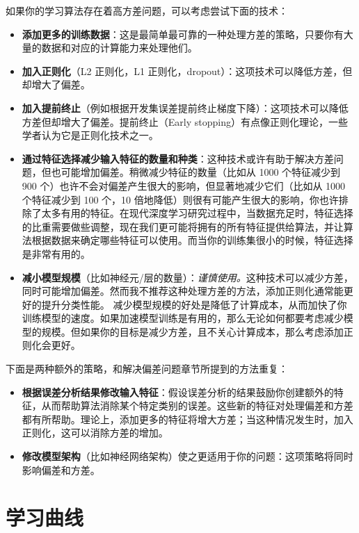 如果你的学习算法存在着高方差问题，可以考虑尝试下面的技术：

\begin{itemize}
\tightlist
\item
  \textbf{添加更多的训练数据}：这是最简单最可靠的一种处理方差的策略，只要你有大量的数据和对应的计算能力来处理他们。
\item
  \textbf{加入正则化}（L2 正则化，L1
  正则化，dropout）：这项技术可以降低方差，但却增大了偏差。
\item
  \textbf{加入提前终止}（例如根据开发集误差提前终止梯度下降）：这项技术可以降低方差但却增大了偏差。提前终止（Early
  stopping）有点像正则化理论，一些学者认为它是正则化技术之一。
\item
  \textbf{通过特征选择减少输入特征的数量和种类}：这种技术或许有助于解决方差问题，但也可能增加偏差。稍微减少特征的数量（比如从
  1000 个特征减少到 900
  个）也许不会对偏差产生很大的影响，但显著地减少它们（比如从 1000
  个特征减少到 100 个，10
  倍地降低）则很有可能产生很大的影响，你也许排除了太多有用的特征。在现代深度学习研究过程中，当数据充足时，特征选择的比重需要做些调整，现在我们更可能将拥有的所有特征提供给算法，并让算法根据数据来确定哪些特征可以使用。而当你的训练集很小的时候，特征选择是非常有用的。
\item
  \textbf{减小模型规模}（比如神经元/层的数量）：\emph{谨慎使用。}这种技术可以减少方差，同时可能增加偏差。然而我不推荐这种处理方差的方法，添加正则化通常能更好的提升分类性能。
  减少模型规模的好处是降低了计算成本，从而加快了你训练模型的速度。如果加速模型训练是有用的，那么无论如何都要考虑减少模型的规模。但如果你的目标是减少方差，且不关心计算成本，那么考虑添加正则化会更好。
\end{itemize}

下面是两种额外的策略，和解决偏差问题章节所提到的方法重复：

\begin{itemize}
\tightlist
\item
  \textbf{根据误差分析结果修改输入特征}：假设误差分析的结果鼓励你创建额外的特征，从而帮助算法消除某个特定类别的误差。这些新的特征对处理偏差和方差都有所帮助。理论上，添加更多的特征将增大方差；当这种情况发生时，加入正则化，这可以消除方差的增加。
\item
  \textbf{修改模型架构}（比如神经网络架构）使之更适用于你的问题：这项策略将同时影响偏差和方差。
\end{itemize}

\hypertarget{ux5b66ux4e60ux66f2ux7ebf}{%
\part{学习曲线}\label{ux5b66ux4e60ux66f2ux7ebf}}

